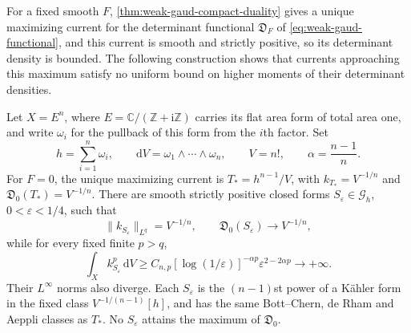 For a fixed smooth $F$, \cref{thm:weak-gaud-compact-duality} gives a unique maximizing current for the determinant functional $\mathfrak D_F$ of \eqref{eq:weak-gaud-functional}, and this current is smooth and strictly positive, so its determinant density is bounded. The following construction shows that currents approaching this maximum satisfy no uniform bound on higher moments of their determinant densities.

\begin{proposition}\label{prop:gaud-determinant-concentration}
Let $X=E^n$, where $E=\mathbb C/(\mathbb Z+\mathrm i\mathbb Z)$ carries its flat area form of total area one, and write $\omega_i$ for the pullback of this form from the $i$th factor. Set
\[
 h=\sum_{i=1}^n\omega_i,\qquad
 \mathrm{d}V=\omega_1\wedge\cdots\wedge\omega_n,\qquad V=n!,\qquad
 \alpha=\frac{n-1}{n}.
\]
For $F=0$, the unique maximizing current is
$T_*=h^{n-1}/V$, with $k_{T_*}=V^{-1/n}$ and
$\mathfrak D_0(T_*)=V^{-1/n}$.
There are smooth strictly positive closed forms $S_\varepsilon\in\mathscr G_h$, $0<\varepsilon<1/4$, such that
\[
 \|k_{S_\varepsilon}\|_{L^q}=V^{-1/n},\qquad
 \mathfrak D_0(S_\varepsilon)\longrightarrow V^{-1/n},
\]
while for every fixed finite $p>q$,
\begin{equation}\label{eq:gaud-concentration-moments}
 \int_X k_{S_\varepsilon}^{p}\,\mathrm{d}V
 \geq C_{n,p}[\log(1/\varepsilon)]^{-\alpha p}
                    \varepsilon^{2-2\alpha p}\longrightarrow+\infty.
\end{equation}
Their $L^\infty$ norms also diverge. Each $S_\varepsilon$ is the $(n-1)$st power of a K\"ahler form in the fixed class $V^{-1/(n-1)}[h]$, and has the same Bott--Chern, de Rham and Aeppli classes as $T_*$. No $S_\varepsilon$ attains the maximum of $\mathfrak D_0$.
\end{proposition}
